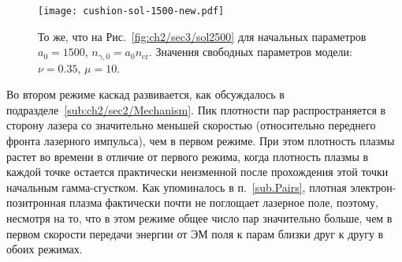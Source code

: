 \begin{figure}[ht]
    \texttt{[image: cushion-sol-1500-new.pdf]}
    \caption[То же, что на Рис.~\ref{fig:ch2/sec3/sol2500} для начальных параметров $a_0=1500$, $n_{\gamma,0}=a_0 n_\mathrm{cr}$]{\label{fig:ch2/sec3/sol1500} 
    То же, что на Рис.~\ref{fig:ch2/sec3/sol2500} для начальных параметров $a_0=1500$, $n_{\gamma,0}=a_0 n_\mathrm{cr}$. Значения свободных параметров модели: $\nu=0.35$, $\mu=10$.}
\end{figure}


Во втором режиме каскад развивается, как обсуждалось в подразделе~\ref{sub:ch2/sec2/Mechanism}.
Пик плотности пар распространяется в сторону лазера со значительно меньшей скоростью (относительно переднего фронта лазерного импульса), чем в первом режиме.
При этом плотность плазмы растет во времени в отличие от первого режима, когда плотность плазмы в каждой точке остается практически неизменной после прохождения этой точки начальным гамма-сгустком.
Как упоминалось в п.~\ref{sub.Pairs}, плотная электрон-позитронная плазма фактически почти не поглощает лазерное поле, поэтому, несмотря на то, что в этом режиме общее число пар значительно больше, чем в первом скорости передачи энергии от ЭМ поля к парам близки друг к другу в обоих режимах.

